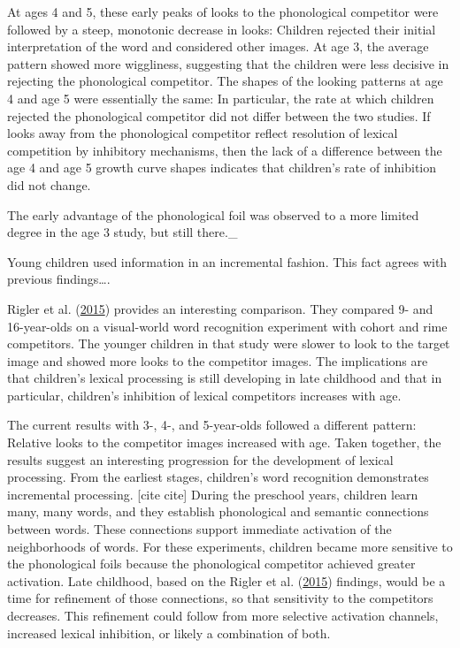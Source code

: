 \documentclass [11pt, proquest] {uwthesis}[2015/03/03]
\begin{document}
At ages 4 and 5, these early peaks of looks to the phonological
competitor were followed by a steep, monotonic decrease in looks:
Children rejected their initial interpretation of the word and
considered other images. At age 3, the average pattern showed more
wiggliness, suggesting that the children were less decisive in rejecting
the phonological competitor. The shapes of the looking patterns at age 4
and age 5 were essentially the same: In particular, the rate at which
children rejected the phonological competitor did not differ between the
two studies. If looks away from the phonological competitor reflect
resolution of lexical competition by inhibitory mechanisms, then the
lack of a difference between the age 4 and age 5 growth curve shapes
indicates that children's rate of inhibition did not change.

The early advantage of the phonological foil was observed to a more
limited degree in the age 3 study, but still there.\_

Young children used information in an incremental fashion. This fact
agrees with previous findings\ldots{}.

Rigler et al. (\protect\hyperlink{ref-Rigler2015}{2015}) provides an
interesting comparison. They compared 9- and 16-year-olds on a
visual-world word recognition experiment with cohort and rime
competitors. The younger children in that study were slower to look to
the target image and showed more looks to the competitor images. The
implications are that children's lexical processing is still developing
in late childhood and that in particular, children's inhibition of
lexical competitors increases with age.

The current results with 3-, 4-, and 5-year-olds followed a different
pattern: Relative looks to the competitor images increased with age.
Taken together, the results suggest an interesting progression for the
development of lexical processing. From the earliest stages, children's
word recognition demonstrates incremental processing. {[}cite cite{]}
During the preschool years, children learn many, many words, and they
establish phonological and semantic connections between words. These
connections support immediate activation of the neighborhoods of words.
For these experiments, children became more sensitive to the
phonological foils because the phonological competitor achieved greater
activation. Late childhood, based on the Rigler et al.
(\protect\hyperlink{ref-Rigler2015}{2015}) findings, would be a time for
refinement of those connections, so that sensitivity to the competitors
decreases. This refinement could follow from more selective activation
channels, increased lexical inhibition, or likely a combination of both.
\end{document}
